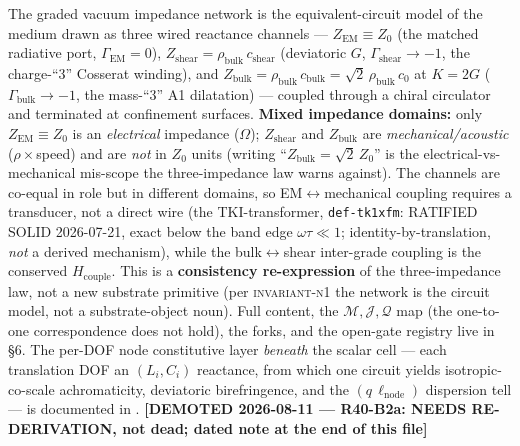 \noindent The graded vacuum impedance network is the equivalent-circuit model of the medium drawn as three wired reactance channels --- $Z_{\mathrm{EM}} \equiv Z_0$ (the matched radiative port, $\Gamma_{\mathrm{EM}}=0$), $Z_{\mathrm{shear}}=\rho_{\mathrm{bulk}}\,c_{\mathrm{shear}}$ (deviatoric $G$, $\Gamma_{\mathrm{shear}}\to-1$, the charge-``3'' Cosserat winding), and $Z_{\mathrm{bulk}}=\rho_{\mathrm{bulk}}\,c_{\mathrm{bulk}}=\sqrt{2}\,\rho_{\mathrm{bulk}}\,c_0$ at $K=2G$ ($\Gamma_{\mathrm{bulk}}\to-1$, the mass-``3'' A1 dilatation) --- coupled through a chiral circulator and terminated at confinement surfaces. \textbf{Mixed impedance domains:} only $Z_{\mathrm{EM}}\equiv Z_0$ is an \emph{electrical} impedance ($\Omega$); $Z_{\mathrm{shear}}$ and $Z_{\mathrm{bulk}}$ are \emph{mechanical/acoustic} ($\rho\times$speed) and are \emph{not} in $Z_0$ units (writing ``$Z_{\mathrm{bulk}}=\sqrt2\,Z_0$'' is the electrical-vs-mechanical mis-scope the three-impedance law warns against). The channels are co-equal in role but in different domains, so EM$\leftrightarrow$mechanical coupling requires a transducer, not a direct wire (the TKI-transformer, \texttt{def-tk1xfm}: RATIFIED SOLID 2026-07-21, exact below the band edge $\omega\tau\ll1$; identity-by-translation, \emph{not} a derived mechanism), while the bulk$\leftrightarrow$shear inter-grade coupling is the conserved $H_{\mathrm{couple}}$. This is a \textbf{consistency re-expression} of the three-impedance law, not a new substrate primitive (per \textsc{invariant-n1} the network is the circuit model, not a substrate-object noun). Full content, the $\mathcal{M},\mathcal{J},\mathcal{Q}$ map (the one-to-one correspondence does not hold), the forks, and the open-gate registry live in  \S6. The per-DOF node constitutive layer \emph{beneath} the scalar cell --- each translation DOF an $(L_i,C_i)$ reactance, from which one circuit yields isotropic-co-scale achromaticity, deviatoric birefringence, and the $(q\,\ell_{\mathrm{node}})$ dispersion tell --- is documented in . \textbf{[DEMOTED 2026-08-11 --- R40-B2a: NEEDS RE-DERIVATION, not dead; dated note at the end of this file]}

